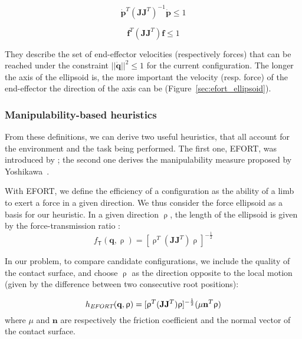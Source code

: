  \begin{equation} 
 \label{eq:vel}
\mathbf{\dot{p}}^T(\mathbf{J}\mathbf{J}^T)^{-1}\mathbf{\dot{p}} \leq 1 
\end{equation}
 
 \begin{equation} 
 \label{eq:for}
\mathbf{f}^T (\mathbf{J}\mathbf{J}^T) \mathbf{f} \leq 1
\end{equation}

They describe the set of end-effector velocities (respectively forces) that can
be reached under the constraint $||\dot{\mathbf{q}}||^2 \leq 1$ for the current configuration.
The longer the axis of the ellipsoid is, the more important the velocity (resp. force) of the end-effector the direction of the axis can be (Figure~\ref{sec:efort_ellipsoid}).
 
\subsubsection{Manipulability-based heuristics}
From these definitions, we can derive two useful heuristics, that all account for the environment and the task being performed.
The first one, EFORT, was introduced by \cite{Tonneau2014}; the second one derives the manipulability measure proposed by Yoshikawa~\cite{Yoshikawa1984}.

With EFORT, we define the efficiency of a configuration as the ability of a limb to exert a force in a given direction.
We thus consider the force ellipsoid as a basis for our heuristic.
In a given direction $\uprho$, the length of the ellipsoid is given by the force-transmission ratio \citep{1087795}:
\begin{equation*}
f_\mathsf{T}(\mathbf{q}, \uprho) = [\uprho^{T}(\mathbf{J}\mathbf{J}	^{T})\uprho]^{-\frac{1}{2}}
\end{equation*}

In our problem, to compare candidate configurations, we include the quality of the contact surface, and choose $\uprho$ as the direction
opposite to the local motion (given by the difference between two consecutive root positions):

\begin{equation}
h_{\textrm{\it EFORT}}(\mathbf{q}, \uprho) = [\uprho^{T}(\mathbf{J}\mathbf{J}^T)\uprho]^{-\frac{1}{2}} ( \mu \mathbf{n}^T \uprho)
\end{equation}
where $\mu$ and $\mathbf{n}$ are respectively the friction coefficient and the normal vector of the contact surface.


